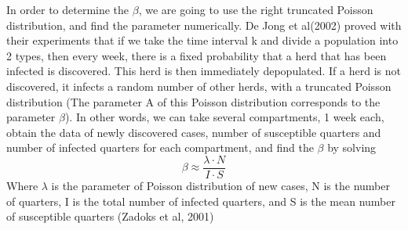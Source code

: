\par In order to determine the $\beta$, we are going to use the right truncated Poisson distribution, and find the parameter numerically.
De Jong et al(2002)\cite{DeJorg} proved with their experiments that if we take the time interval k and divide a population into 2 types, then every week, there is a fixed probability that a
 herd that has been infected is discovered. This herd is then immediately depopulated. If a herd is not discovered, it infects
 a random number of other herds, with a truncated Poisson
 distribution (The parameter A of this Poisson distribution
 corresponds to the parameter $\beta$). In other words, we can take several compartments, 1 week each, obtain the data of newly discovered cases, number of susceptible quarters and number of infected quarters for each compartment, and find the $\beta$ by solving
\begin{equation}
	\beta \approx \frac{\lambda \cdot N}{I\cdot S}\label{eq:4.2.5}
\end{equation}
Where $\lambda$ is the parameter of Poisson distribution of new cases, N is the number of quarters, I is the total number of infected quarters, and S is the mean number of susceptible quarters (Zadoks et al, 2001)\cite{R.N.Zadoks}
